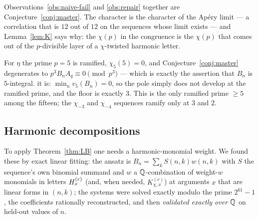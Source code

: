 Observations~\ref{obs:naive-fail} and \ref{obs:repair} together are
Conjecture~\ref{conj:master}. The character is the character of the Ap\'ery limit --- a
correlation that is $12$ out of $12$ on the sequences whose limit exists --- and
Lemma~\ref{lem:K} says why: the $\chi(p)$ in the congruence is the $\chi(p)$ that comes
out of the $p$-divisible layer of a $\chi$-twisted harmonic letter.

\begin{observation}\label{obs:ramified}
For $\eta$ the prime $p=5$ is ramified, $\chi_5(5)=0$, and
Conjecture~\ref{conj:master} degenerates to $p^3B_nA_q\equiv0\pmod{p^3}$ --- which is
exactly the assertion that $B_n$ is $5$-integral.  it is:
$\min_n v_5(B_n)=0$, so the pole simply does not develop at the ramified prime, and the
floor is exactly $3$. This is the only ramified prime $\ge5$ among the fifteen; the
$\chi_{-3}$ and $\chi_{-4}$ sequences ramify only at $3$ and $2$.
\end{observation}

\subsection{Harmonic decompositions}
\label{ssec:decomp}

To apply Theorem~\ref{thm:LB} one needs a harmonic-monomial weight. We found these by
exact linear fitting: the ansatz is $B_n=\sum_kS(n,k)w(n,k)$ with $S$ the sequence's own
binomial summand and $w$ a $\mathbb{Q}$-combination of weight-$w$ monomials in letters $H^{(r)}_{x}$
(and, when needed, $K^{(r)}_{\chi,x}$) at arguments $x$ that are linear forms in $(n,k)$;
the systems were solved exactly modulo the prime $2^{61}-1$, the coefficients rationally
reconstructed, and then \emph{validated exactly over $\mathbb{Q}$} on held-out values of $n$.

